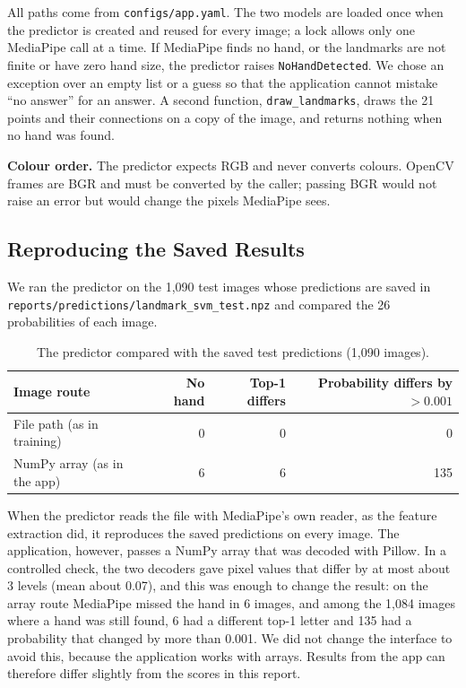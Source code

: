 All paths come from \texttt{configs/app.yaml}. The two models are loaded once when the predictor is created and reused for every image; a lock allows only one MediaPipe call at a time. If MediaPipe finds no hand, or the landmarks are not finite or have zero hand size, the predictor raises \texttt{NoHandDetected}. We chose an exception over an empty list or a guess so that the application cannot mistake ``no answer'' for an answer. A second function, \texttt{draw\_landmarks}, draws the 21 points and their connections on a copy of the image, and returns nothing when no hand was found.

\textbf{Colour order.} The predictor expects RGB and never converts colours. OpenCV frames are BGR and must be converted by the caller; passing BGR would not raise an error but would change the pixels MediaPipe sees.

\subsection{Reproducing the Saved Results}

We ran the predictor on the 1{,}090 test images whose predictions are saved in \texttt{reports/predictions/\allowbreak landmark\_svm\_test.npz} and compared the 26 probabilities of each image.

\begin{table}[h]
\centering
\caption{The predictor compared with the saved test predictions (1{,}090 images).}
\label{tab:landmark-inference-check}
\begin{tabular}{lrrr}
\hline
Image route & No hand & Top-1 differs & Probability differs by $>0.001$ \\
\hline
File path (as in training) & 0 & 0 & 0 \\
NumPy array (as in the app) & 6 & 6 & 135 \\
\hline
\end{tabular}
\end{table}

When the predictor reads the file with MediaPipe's own reader, as the feature extraction did, it reproduces the saved predictions on every image. The application, however, passes a NumPy array that was decoded with Pillow. In a controlled check, the two decoders gave pixel values that differ by at most about 3 levels (mean about 0.07), and this was enough to change the result: on the array route MediaPipe missed the hand in 6 images, and among the 1{,}084 images where a hand was still found, 6 had a different top-1 letter and 135 had a probability that changed by more than 0.001. We did not change the interface to avoid this, because the application works with arrays. Results from the app can therefore differ slightly from the scores in this report.

